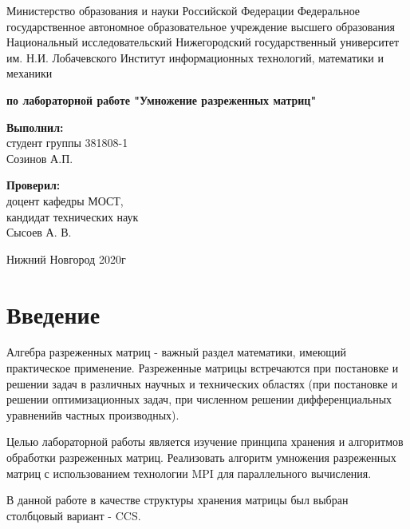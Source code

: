 \documentclass{report}
\begin{document}
\begin{titlepage}

\begin{center}Министерство образования и науки Российской Федерации 
Федеральное государственное автономное образовательное учреждение 
высшего образования Национальный исследовательский 
Нижегородский государственный университет им. Н.И. Лобачевского 
Институт информационных технологий, математики и механики

\vspace{8em}
\textbf{ по лабораторной работе "Умножение разреженных матриц"} \end{center}

\vspace{8em}

\begin{flushright}  \textbf{Выполнил:} \\ студент группы 381808-1  \\ Созинов А.П. \end{flushright}
\begin{flushright}  \textbf{Проверил:}  \\ доцент кафедры МОСТ, \\ кандидат технических наук \\ Сысоев А. В.\\ \end{flushright}

\vspace{\fill}
\begin{center} Нижний Новгород  2020г \end{center}
\end{titlepage}

\setcounter{page}{2}

\tableofcontents

\newpage
\section*{Введение}
\par Алгебра разреженных матриц - важный раздел математики, имеющий практическое применение. Разреженные матрицы
встречаются при постановке и решении задач в различных научных и технических областях (при постановке и решении оптимизационных задач,
при численном решении дифференциальных уравненийв частных производных).
\par Целью лабораторной работы является изучение принципа хранения и алгоритмов обработки разреженных матриц. Реализовать алгоритм умножения разреженных матриц с использованием технологии MPI для параллельного вычисления.
\par В данной работе в качестве структуры хранения матрицы был выбран столбцовый вариант - CCS. 
\newpage
\end{document}
